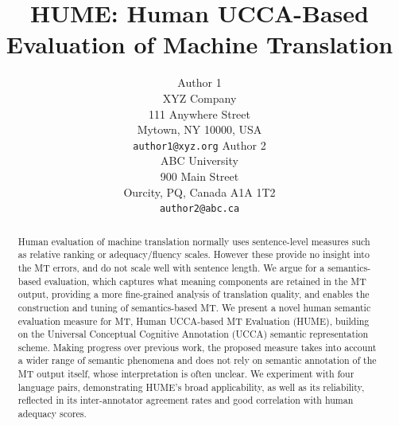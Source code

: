\documentclass[11pt,letterpaper]{article}
\title{HUME: Human UCCA-Based Evaluation of Machine Translation}
\author{Author 1\\
	    XYZ Company\\
	    111 Anywhere Street\\
	    Mytown, NY 10000, USA\\
	    {\tt author1@xyz.org}
	  \And
	Author 2\\
  	ABC University\\
  	900 Main Street\\
  	Ourcity, PQ, Canada A1A 1T2\\
  {\tt author2@abc.ca}}
\date{}
\begin{document}
\maketitle

\begin{abstract}
  

Human evaluation of machine translation normally uses sentence-level measures such as relative ranking
or adequacy/fluency scales. However these provide no insight into the MT errors,
and do not scale well with sentence length.
We argue for a semantics-based evaluation, which captures what meaning components
are retained in the MT output, providing a more fine-grained analysis of
translation quality, and enables the construction and tuning of semantics-based MT. 
We present a novel human semantic evaluation measure for MT, Human
UCCA-based MT Evaluation (HUME), building on the Universal Conceptual Cognitive Annotation (UCCA)
semantic representation scheme.
Making progress over previous work, the proposed measure takes into account
a wider range of semantic phenomena and does not rely on semantic annotation
of the MT output itself, whose interpretation is often unclear.
We experiment with four language pairs, demonstrating HUME's broad applicability,
as well as its reliability, reflected in its inter-annotator agreement rates and 
good correlation with human adequacy scores.



\end{abstract}
\end{document}
